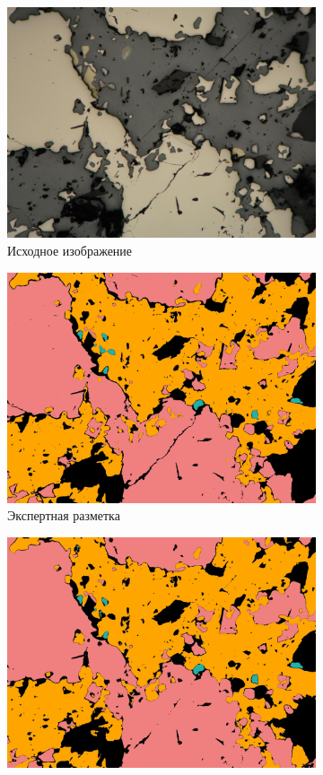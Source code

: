\begin{figure}[H]
\begin{subfigure}{.33\textwidth}
  \centering
  \includegraphics[width=.9\linewidth]{pics/image_5_src.jpg}
  \caption{Исходное изображение}
  \label{fig:sfig3_1}
\end{subfigure}%
\begin{subfigure}{.33\textwidth}
  \centering
  \includegraphics[width=.9\linewidth]{pics/image_5_gt.jpg}
  \caption{Экспертная разметка}
  \label{fig:sfig3_2}
\end{subfigure}%
\begin{subfigure}{.33\textwidth}
  \centering
  \includegraphics[width=.9\linewidth]{pics/image_5_pred.jpg}

\end{subfigure}
\end{figure}
